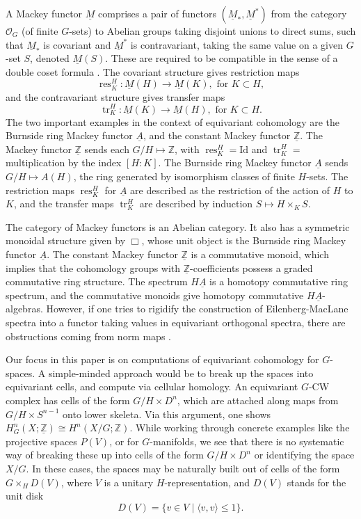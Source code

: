 \documentclass[a4paper,leqno,11pt]{amsart}
\theoremstyle{plain}
\theoremstyle{definition}
\theoremstyle{remark}
\theoremstyle{definition}
\newcommand{\Z}{{\mathbb{Z}}}
\newcommand{\OG}{\mathcal{O}_G}
\newcommand\tr{\operatorname{tr}}
\newcommand{\pair}[1]{\langle #1\rangle}
\newcommand{\Id}{\mbox{Id}}
\newcommand{\res}{\mathit{res}}
\newcommand{\uA}{\underline{A}}
\newcommand{\uM}{\underline{M}}
\newcommand{\uZ}{\underline{\mathbb{Z}}}
\def\Z{\mathbb{Z}}
\numberwithin{equation}{section}
\renewcommand{\res}{\operatorname{res}}
\begin{document}
	A Mackey functor $\uM$ \cite{Dre72} comprises a pair of functors $(\uM_\ast, \uM^{\ast})$ from the category $\OG$ (of finite $G$-sets) to Abelian groups taking disjoint unions to direct sums, such that $\uM_\ast$ is covariant and $\uM^\ast$ is contravariant, taking the same value on a given $G$-set $S$, denoted $\uM(S)$. These are required to be compatible in the sense of a double coset formula \cite{TW95}. The covariant  structure gives restriction maps 
	\[ \res^H_K : \uM(H) \to \uM(K), \mbox{ for } K \subset H,\]      
	and the contravariant structure gives transfer maps 
	\[ \tr^H_K : \uM(K) \to \uM(H), \mbox{ for } K\subset H.\]
The two important examples in the context of equivariant cohomology are the Burnside ring Mackey functor $\uA$, and the constant Mackey functor $\uZ$. The  Mackey functor $\uZ$ sends each $G/H \mapsto \Z$, with $\res^H_K=\Id$ and $\tr^H_K=$ multiplication by the index $[H: K]$. The Burnside ring Mackey functor $\uA$ sends $G/H\mapsto A(H)$, the ring generated by isomorphism classes of finite $H$-sets. The restriction maps $\res^H_K$ for $\uA$ are described as the restriction of  the action of $H$ to $K$, and the transfer maps $\tr^H_K$ are described by induction $S \mapsto H\times_K S$.   
	
	The category of Mackey functors is an Abelian category. It also has a symmetric monoidal structure given by $\Box$, whose unit object is the Burnside ring Mackey functor $\uA$. The constant Mackey functor $\uZ$ is  a commutative monoid, which implies that the cohomology groups with $\uZ$-coefficients possess a graded commutative ring structure. The spectrum $H\uA$ is a homotopy commutative ring spectrum, and the commutative monoids give homotopy commutative $H\uA$-algebras. However, if one tries to rigidify the construction of Eilenberg-MacLane spectra into a functor taking values in equivariant orthogonal spectra, there are obstructions coming from norm maps \cite{Ull13,HHR}. 
	
	Our focus in this paper is on computations of equivariant cohomology for $G$-spaces. A simple-minded approach would be to break up the spaces into equivariant cells, and compute via cellular homology.  An equivariant $G$-CW complex has cells of the form $G/H\times D^n$, which are attached along maps from $G/H\times S^{n-1}$ onto lower skeleta. Via this argument, one shows $H^n_G(X;\uZ)\cong H^n(X/G;\Z)$. While working through concrete examples like the projective spaces $P(V)$, or for $G$-manifolds, we see that there is no systematic way of breaking these up into cells of the form $G/H\times D^n$ or identifying the space $X/G$. In these cases, the spaces may be naturally built out of cells of the form $G\times_H D(V)$\cite{Was69}, where $V$ is a unitary $H$-representation, and $D(V)$ stands for the unit disk 
	\[ D(V)= \{ v\in V \mid \pair{v,v} \leq 1 \} .\] 
\end{document}
